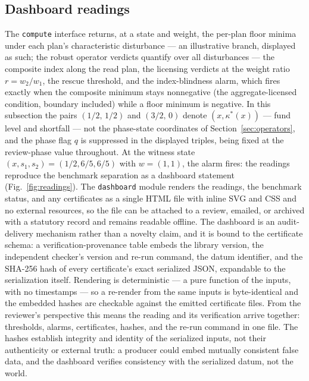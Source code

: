 \documentclass[11pt]{article}
\begin{document}
\subsection{Dashboard readings}\label{sec:readings}

The \texttt{compute} interface returns, at a state and weight, the per-plan
floor minima under each plan's characteristic disturbance --- an
illustrative branch, displayed as such; the robust operator verdicts
quantify over all disturbances --- the composite
index along the read plan, the licensing verdicts at the weight ratio
$r = w_2/w_1$, the rescue threshold, and the index-blindness alarm, which
fires exactly when the composite minimum stays nonnegative (the
aggregate-licensed condition, boundary included) while a floor
minimum is negative. In this subsection the pairs $(1/2,\, 1/2)$ and
$(3/2,\, 0)$ denote $(x, \kappa^*(x))$ --- fund level and shortfall --- not
the phase-state coordinates of Section~\ref{sec:operators}, and the phase
flag $q$ is suppressed in the displayed triples, being fixed at the
review-phase value throughout. At the witness state $(x, s_1, s_2) = (1/2, 6/5, 6/5)$
with $w = (1,1)$, the alarm fires: the readings reproduce the benchmark
separation as a dashboard statement (Fig.~\ref{fig:readings}). The
\texttt{dashboard} module renders the readings, the benchmark status, and
any certificates as a single HTML file with inline SVG and CSS and no
external resources, so the file can be attached to a review, emailed, or
archived with a statutory record and remains readable offline. The
dashboard is an audit-delivery mechanism rather than a novelty claim, and
it is bound to the certificate schema: a verification-provenance table
embeds the library version, the independent checker's version and re-run
command, the datum identifier, and the SHA-256 hash of every
certificate's exact serialized JSON, expandable to the serialization
itself. Rendering is deterministic --- a pure function of the inputs,
with no timestamps --- so a re-render from the same inputs is
byte-identical and the embedded hashes are checkable against the emitted
certificate files. From the reviewer's perspective this means the reading
and its verification arrive together: thresholds, alarms, certificates,
hashes, and the re-run command in one file. The hashes establish
integrity and identity of the serialized inputs, not their authenticity
or external truth: a producer could embed mutually consistent false
data, and the dashboard verifies consistency with the serialized datum,
not the world.
\end{document}
